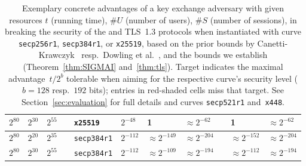 \begin{table}[t]
\begin{tabular}{@{}lllllllllll@{}}
$2^{80}$	&$2^{30}$	&$2^{55}$	&&\texttt{x25519}	&$2^{-48}$	&\cellcolor{red!25}1			&$\approx 2^{-62}$	&& \cellcolor{red!25}1			&$\approx 2^{-62}$	 \\
\midrule
$2^{80}$	&$2^{20}$	&$2^{35}$	&&\texttt{secp384r1}	&$2^{-112}$	&$\approx 2^{-149}$	& $\approx 2^{-204}$	&& $\approx 2^{-152}$	& $\approx 2^{-204}$	 \\
$2^{80}$	&$2^{30}$	&$2^{55}$	&&\texttt{secp384r1}	&$2^{-112}$	&\cellcolor{red!25}$\approx 2^{-109}$	&$\approx 2^{-194}$	&& \cellcolor{orange!25}$\approx 2^{-112}$	& $\approx 2^{-194}$	 \\
	\bottomrule
	\end{tabular}
	
	\medskip
	
	\caption{%
		Exemplary concrete advantages of a key exchange adversary with given resources $t$ (running time), $\#U$ (number of users), $\#S$ (number of sessions), in breaking the security of the \SIGMA and TLS~1.3 protocols
		when instantiated with curve \texttt{secp256r1}, \texttt{secp384r1}, or \texttt{x25519},
		based on the prior bounds by Canetti-Krawczyk~\cite{C:CanKra02} resp.\ Dowling et al.~\cite{JC:DFGS21}, and the bounds we establish (Theorem~\ref{thm:SIGMAI} and~\ref{thm:tls}).
		Target indicates the maximal advantage~$t/2^b$ tolerable when aiming for the respective curve's security level ($b = 128$ resp.\ $192$ bits);
		entries in red-shaded cells miss that target.
		See Section~\ref{sec:evaluation} %
		for full details and curves \texttt{secp521r1} and~\texttt{x448}.
	}
	\label{tbl:bounds-overview}
\end{table}

